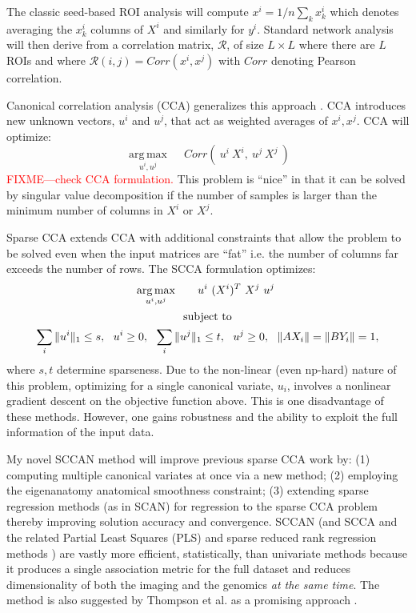 \documentclass{llncs}
\begin{document}
The classic seed-based ROI analysis will compute $x^i = 1/n \sum_k x^i_k$ which denotes averaging the $x^i_k$ columns of $X^i$ and similarly for $y^i$.  Standard network analysis will then derive from a correlation matrix, $\mathcal{R}$, of size $L \times L$ where there are $L$ ROIs and where $\mathcal{R}(i,j)=Corr(x^i,x^j)$ with $Corr$ denoting Pearson correlation. 

Canonical correlation analysis (CCA) generalizes this approach \cite{Hotelling}.  CCA introduces new unknown vectors, $u^i$ and $u^j$, that act as weighted averages of $x^i, x^j$.  CCA will optimize:
\begin{equation}
\underset{u^i,u^j}{\operatorname{arg\,max}} \quad~ Corr(~u^i~X^i,~u^j~X^j~) 
\end{equation}
\textcolor{red}{FIXME---check CCA formulation.}
This problem is ``nice'' in that it can be solved by singular value decomposition if the number of samples is larger than the minimum number of columns in $X^i$ or $X^j$.

Sparse CCA extends CCA with additional constraints that allow the problem to be solved even when the input matrices are ``fat'' i.e. the number of columns far exceeds the number of rows.  The SCCA formulation optimizes: 
\begin{gather*}
\underset{u^i,u^j}{\operatorname{arg\,max}} \quad~ ~~u^i~(X^i)^T ~X^j~u^j~\\ \notag \text{subject to} \\ \notag
\sum_i \|u^i\|_1 \leq s, ~~ u^i \ge 0,~~ \sum_i \|u^j\|_1 \leq t, ~~ u^j \ge 0 , ~~\| A X_i \| = \| B Y_i \| = 1,
\end{gather*}
where $s, t$ determine sparseness.  Due to the non-linear (even np-hard) nature of this problem, optimizing for a single canonical variate, $u_i$, involves a nonlinear gradient descent on the objective function above.  This is one disadvantage of these methods.  However, one gains robustness and the ability to exploit the full information of the input data.  

My novel SCCAN method will improve previous sparse CCA work by: (1) computing multiple canonical variates at once via a new method; (2) employing the eigenanatomy anatomical smoothness constraint; (3) extending sparse regression methods (as in SCAN) for regression to the sparse CCA problem thereby improving solution accuracy and convergence. %
SCCAN (and SCCA \cite{witten_extensions_2009} and the related Partial Least Squares (PLS) \cite{LeFloch2012} and sparse reduced rank regression methods \cite{Vounou2010}) are vastly more efficient, statistically, than univariate methods because it produces a single association metric for the full dataset and reduces dimensionality of both the imaging and the genomics {\em at the same time}.  %
The method is also suggested by Thompson et al. as a promising approach \cite{Glahn2007,Thompson2010}. 
\end{document}
